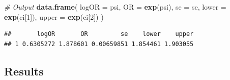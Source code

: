 \documentclass[
]{article}
\newenvironment{Shaded}{\begin{snugshade}}{\end{snugshade}}
\newcommand{\AttributeTok}[1]{\textcolor[rgb]{0.13,0.29,0.53}{#1}}
\newcommand{\CommentTok}[1]{\textcolor[rgb]{0.56,0.35,0.01}{\textit{#1}}}
\newcommand{\DecValTok}[1]{\textcolor[rgb]{0.00,0.00,0.81}{#1}}
\newcommand{\FunctionTok}[1]{\textcolor[rgb]{0.13,0.29,0.53}{\textbf{#1}}}
\newcommand{\NormalTok}[1]{#1}
\begin{document}
\begin{Shaded}
\begin{Highlighting}[]
\CommentTok{\# Output}
\FunctionTok{data.frame}\NormalTok{(}
  \AttributeTok{logOR =}\NormalTok{ psi,}
  \AttributeTok{OR =} \FunctionTok{exp}\NormalTok{(psi),}
  \AttributeTok{se =}\NormalTok{ se,}
  \AttributeTok{lower =} \FunctionTok{exp}\NormalTok{(ci[}\DecValTok{1}\NormalTok{]),}
  \AttributeTok{upper =} \FunctionTok{exp}\NormalTok{(ci[}\DecValTok{2}\NormalTok{])}
\NormalTok{)}
\end{Highlighting}
\end{Shaded}

\begin{verbatim}
##       logOR       OR         se    lower    upper
## 1 0.6305272 1.878601 0.00659851 1.854461 1.903055
\end{verbatim}

\subsection{Results}\label{results}
\end{document}
